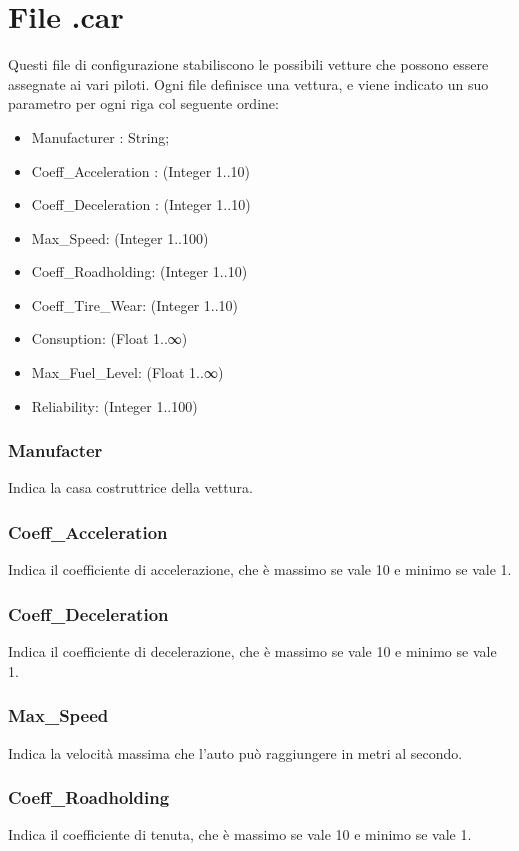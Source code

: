 \documentclass[a4paper,11pt, twoside, openright]{book}
\begin{document}
      \section{File .car}
	Questi file di configurazione stabiliscono le possibili vetture che possono essere assegnate ai vari piloti.
	Ogni file definisce una vettura, e viene indicato un suo parametro per ogni riga col seguente ordine:
	
	\begin{itemize}
	  \item Manufacturer : String;
	  \item Coeff\_Acceleration : (Integer 1..10)
	  \item Coeff\_Deceleration : (Integer 1..10)
	  \item Max\_Speed: (Integer 1..100)
	  \item Coeff\_Roadholding: (Integer 1..10)
	  \item Coeff\_Tire\_Wear: (Integer 1..10)
	  \item Consuption: (Float 1..∞)
	  \item Max\_Fuel\_Level: (Float 1..∞)
	  \item Reliability: (Integer 1..100)
	\end{itemize}
	
	\subsubsection{Manufacter}
	  Indica la casa costruttrice della vettura.

	\subsubsection{Coeff\_Acceleration}
	  Indica il coefficiente di accelerazione, che è massimo se vale 10 e minimo se vale 1.

	\subsubsection{Coeff\_Deceleration}
	Indica il coefficiente di decelerazione, che è massimo se vale 10 e minimo se vale 1.

	\subsubsection{Max\_Speed}
	  Indica la velocità massima che l'auto può raggiungere in metri al secondo.

	\subsubsection{Coeff\_Roadholding}
	  Indica il coefficiente di tenuta, che è massimo se vale 10 e minimo se vale 1.
\end{document}
